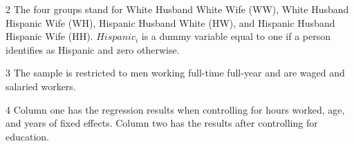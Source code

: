\begin{table}[H]
{\begin{threeparttable}
\begin{tablenotes}
\item[2] \footnotesize{The four groups stand for White Husband White Wife (WW), White Husband Hispanic Wife (WH), Hispanic Husband White (HW), and Hispanic Husband Hispanic Wife (HH). $Hispanic_{i}$ is a dummy variable equal to one if a person identifies as Hispanic and zero otherwise.}
\item[3] \footnotesize{The sample is restricted to men working full-time full-year and are waged and salaried workers.}
\item[4] \footnotesize{Column one has the regression results when controlling for hours worked, age, and years of fixed effects. Column two has the results after controlling for education.}
\end{tablenotes}
\end{threeparttable}}
\end{table}
